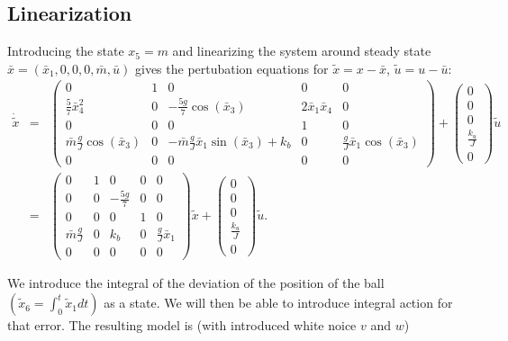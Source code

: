 \subsection{Linearization}

Introducing the state $x_{5}=m$ and linearizing the system around
steady state $\bar{x}=(\bar{x}_{1},0,0,0,\bar{m},\bar{u})$ gives
the pertubation equations for $\tilde{x}=x-\bar{x}$, $\tilde{u}=u-\bar{u}$:
\begin{eqnarray*}
\dot{\tilde{x}} & = & \begin{pmatrix}0 & 1 & 0 & 0 & 0\\
\frac{5}{7}\bar{x}_{4}^{2} & 0 & -\frac{5g}{7}\cos(\bar{x}_{3}) & 2\bar{x}_{1}\bar{x}_{4} & 0\\
0 & 0 & 0 & 1 & 0\\
\bar{m}\frac{g}{J}\cos(\bar{x}_{3}) & 0 & -\bar{m}\frac{g}{J}\bar{x}_{1}\sin(\bar{x}_{3})+k_{b} & 0 & \frac{g}{J}\bar{x}_{1}\cos(\bar{x}_{3})\\
0 & 0 & 0 & 0 & 0
\end{pmatrix}+\begin{pmatrix}0\\
0\\
0\\
\frac{k_{u}}{J}\\
0
\end{pmatrix}\tilde{u}\\
 & = & \begin{pmatrix}0 & 1 & 0 & 0 & 0\\
0 & 0 & -\frac{5g}{7} & 0 & 0\\
0 & 0 & 0 & 1 & 0\\
\bar{m}\frac{g}{J} & 0 & k_{b} & 0 & \frac{g}{J}\bar{x}_{1}\\
0 & 0 & 0 & 0 & 0
\end{pmatrix}\tilde{x}+\begin{pmatrix}0\\
0\\
0\\
\frac{k_{u}}{J}\\
0
\end{pmatrix}\tilde{u}.
\end{eqnarray*}


We introduce the integral of the deviation of the position of the
ball $(\tilde{x}_{6}=\int_{0}^{t}\tilde{x}_{1}dt)$ as a state. We
will then be able to introduce integral action for that error. The
resulting model is (with introduced white noice $v$ and $w$)

